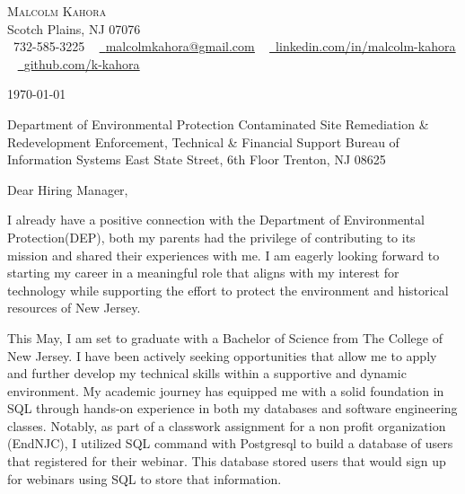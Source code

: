 \documentclass[letterpaper,11pt]{article}
\begin{document}
\begin{center}
    {\Huge \scshape Malcolm Kahora} \\ \vspace{1pt}
    Scotch Plains, NJ 07076 \\ \vspace{1pt}
    \small \raisebox{-0.1\height}\faPhone\ 732-585-3225 ~ \href{mailto:malcolmkahora@gmail.com}{\raisebox{-0.2\height}\faEnvelope\  \underline{malcolmkahora@gmail.com}} ~ 
    \href{https://linkedin.com/in/malcolm-kahora/}{\raisebox{-0.2\height}\faLinkedin\ \underline{linkedin.com/in/malcolm-kahora}}  ~
    \href{https://github.com/k-kahora}{\raisebox{-0.2\height}\faGithub\ \underline{github.com/k-kahora}}
    \vspace{-8pt}
\end{center}

\begin{flushright}
\today\newline %
\end{flushright}
Department of Environmental Protection \newline
Contaminated Site Remediation \& Redevelopment \newline
Enforcement, Technical \& Financial Support \newline
Bureau of Information Systems  East State Street, 6th Floor \newline
Trenton, NJ 08625 \newline

Dear Hiring Manager,

I already have a positive connection with the Department of Environmental Protection(DEP), both my parents
had the privilege of contributing to its mission and shared their experiences with me. I am eagerly
looking forward to starting my career in a meaningful role that aligns with my interest for technology
while supporting the effort to protect the environment and historical resources of New Jersey.

This May, I am set to graduate with a Bachelor of Science from The College of New Jersey. I have been
actively seeking opportunities that allow me to apply and further develop my technical skills within a supportive and dynamic environment. My academic journey has equipped me with a solid foundation in SQL through hands-on experience in both my databases and software engineering classes. Notably, as part of a classwork assignment for a non profit organization (EndNJC), I utilized SQL command with Postgresql to build a database of
users that registered for their webinar.  This database stored users that would sign up for webinars using SQL to store that information.
\end{document}
